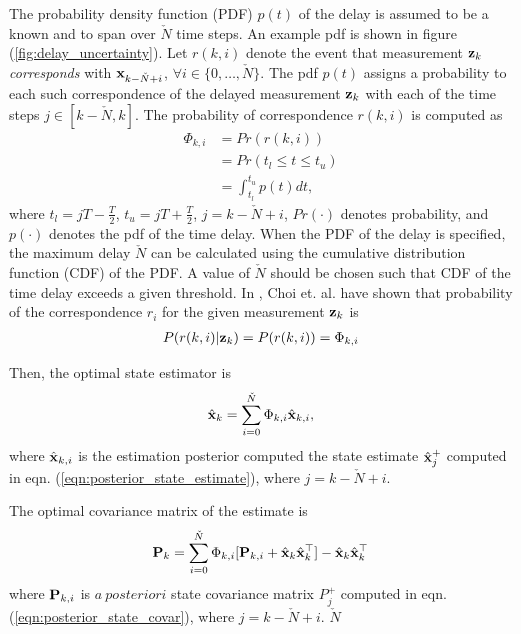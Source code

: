 \blue{}
The probability density function (PDF) $p(t)$ of the delay is assumed to be a known and to  span over $\check{N}$ time steps.
An example pdf is shown in \red figure (\ref{fig:delay_uncertainty}). \blue 
Let $r(k,i)$ denote the event that measurement $\mathbf{z}_k$ {\em corresponds} with $\mathbf{x}_{k-\check{N}+i}$, $\forall i \in \{0, \dots, \check{N}\}$. 
The pdf $p(t)$ assigns a probability to each such correspondence of the delayed measurement $\mathbf{z}_k$ with each of the time steps $j\in[k- \check{N},k]$.
The probability of correspondence $r(k,i)$ is computed as
\begin{align}
	\Phi_{k,i} &= Pr(r(k,i)) \\
	&= Pr(t_l \le t \le t_u) \\
	&= \int_{t_l}^{ t_u} p(t) dt,
\end{align}
where 
$t_l = {jT - \frac{T}{2}}$, 
$t_u = {j T + \frac{T}{2}}$, 
$j = k - \check{N} + i $,
$Pr(\cdot)$ denotes probability, and 
$p(\cdot)$ denotes the pdf of the time delay. 
When the PDF of the delay is specified, the maximum delay $\check{N}$ can be calculated using the cumulative distribution function (CDF) of the PDF. 
A value of $\check{N}$ should be chosen such that CDF of the time delay exceeds a given threshold. \black
In \cite{choi2012state}, Choi et. al. have shown that probability of the correspondence $r_i$ for the given measurement $\mathbf{z}_k$ is
\begin{align}
	P(r(k,i) | \mathbf{z}_k ) = P(r(k,i)) = \Phi_{k,i}
\end{align}

Then, the optimal state estimator is
\begin{align}
	\hat{\mathbf{x}}_k = \sum_{i=0}^{\check{N}} \Phi_{k,i} \hat{\mathbf{x}}_{k,i},
\end{align}
where $\hat{\mathbf{x}}_{k,i}$ is the estimation posterior computed the state estimate $\hat{\mathbf{x}}_j^+$ computed in eqn. (\ref{eqn:posterior_state_estimate}), where $j = k - \check{N} + i$.

The optimal covariance matrix of the estimate is
\begin{align}
	\mathbf{P}_k = \sum_{i = 0}^{\check{N}} \Phi_{k,i} [\mathbf{P}_{k,i} + \hat{\mathbf{x}}_k \hat{\mathbf{x}}_k^\top] - \hat{\mathbf{x}}_k \hat{\mathbf{x}}_k^\top	
\end{align}
where $\mathbf{P}_{k,i}$ is $a~posteriori$ state covariance matrix $P_j^+$ computed in eqn. (\ref{eqn:posterior_state_covar}),  where $j = k - \check{N} + i$. $\check{N}$




